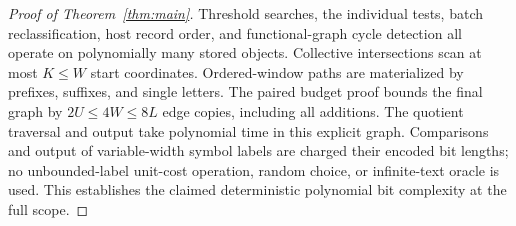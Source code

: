\begin{proof}[Proof of Theorem~\ref{thm:main}]
Threshold searches, the individual tests, batch reclassification, host
record order, and functional-graph cycle detection all operate on
polynomially many stored objects. Collective intersections scan at most
$K\le W$ start coordinates. Ordered-window paths are materialized by
prefixes, suffixes, and single letters. The paired budget proof bounds
the final graph by $2U\le4W\le8L$ edge copies, including all additions.
The quotient traversal and output take polynomial time in this explicit
graph. Comparisons and output of variable-width symbol labels are
charged their encoded bit lengths; no unbounded-label unit-cost operation,
random choice, or infinite-text oracle is used. This establishes the
claimed deterministic polynomial bit complexity at the full scope.
\end{proof}
